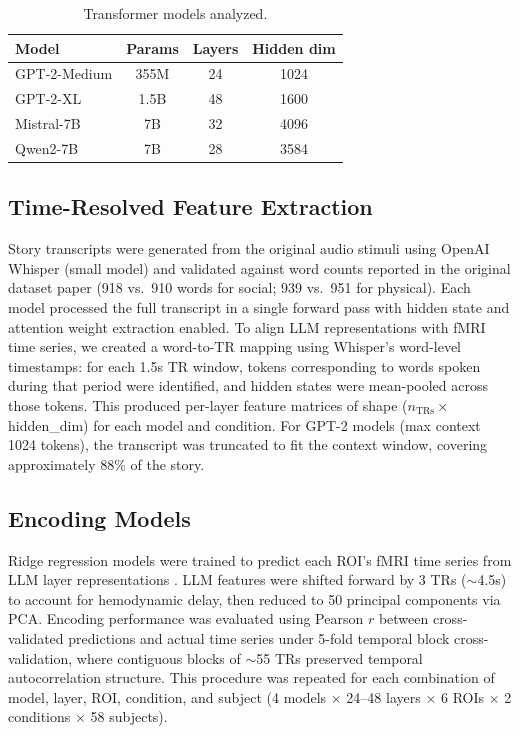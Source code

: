 \documentclass[conference]{IEEEtran}
\begin{document}
\begin{table}[t]
\centering
\caption{Transformer models analyzed.}
\label{tab:models}
\vskip 0.1in
\begin{tabular}{lccc}
\toprule
Model & Params & Layers & Hidden dim \\
\midrule
GPT-2-Medium & 355M & 24 & 1024 \\
GPT-2-XL & 1.5B & 48 & 1600 \\
Mistral-7B & 7B & 32 & 4096 \\
Qwen2-7B & 7B & 28 & 3584 \\
\bottomrule
\end{tabular}
\end{table}

\subsection{Time-Resolved Feature Extraction}

Story transcripts were generated from the original audio stimuli using OpenAI Whisper (small model) and validated against word counts reported in the original dataset paper \cite{nastase2021narratives} (918 vs.\ 910 words for social; 939 vs.\ 951 for physical). Each model processed the full transcript in a single forward pass with hidden state and attention weight extraction enabled. To align LLM representations with fMRI time series, we created a word-to-TR mapping using Whisper's word-level timestamps: for each 1.5s TR window, tokens corresponding to words spoken during that period were identified, and hidden states were mean-pooled across those tokens. This produced per-layer feature matrices of shape ($n_{\text{TRs}} \times$ hidden\_dim) for each model and condition. For GPT-2 models (max context 1024 tokens), the transcript was truncated to fit the context window, covering approximately 88\% of the story.

\subsection{Encoding Models}

Ridge regression models were trained to predict each ROI's fMRI time series from LLM layer representations \cite{caucheteux2022brains, goldstein2022shared}. LLM features were shifted forward by 3 TRs ($\sim$4.5s) to account for hemodynamic delay, then reduced to 50 principal components via PCA. Encoding performance was evaluated using Pearson $r$ between cross-validated predictions and actual time series under 5-fold temporal block cross-validation, where contiguous blocks of $\sim$55 TRs preserved temporal autocorrelation structure. This procedure was repeated for each combination of model, layer, ROI, condition, and subject (4 models $\times$ 24--48 layers $\times$ 6 ROIs $\times$ 2 conditions $\times$ 58 subjects).
\end{document}
